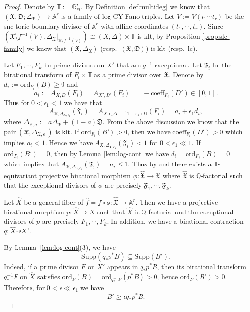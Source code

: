\documentclass[reqno, 12pt]{amsart}
\theoremstyle{definition}
\newcommand{\bA}{\mathbb{A}}
\newcommand{\bQ}{\mathbb{Q}}
\newcommand{\bG}{\mathbb{G}}
\newcommand{\bT}{\mathbb{T}}
\newcommand{\hX}{\widehat{X}}
\newcommand{\Supp}{\mathrm{Supp}}
\newcommand{\ord}{\mathrm{ord}}
\newcommand{\fX}{\mathfrak{X}}
\newcommand{\fD}{\mathfrak{D}}
\newcommand{\fF}{\mathfrak{F}}
\newcommand{\hf}{\hat{f}}
\newcommand{\hfX}{\widehat{\mathfrak{X}}}
\newcommand{\coeff}{\mathrm{coeff}}
\newcommand{\Exc}{\mathrm{Exc}}
\numberwithin{equation}{section}
\begin{document}
\begin{proof}
Denote by $\bT:=\bG_m^r$. By Definition \ref{def:multideg} we know that $(\fX, \fD;\Delta_{\fX}) \to \bA^r$  is a family of log CY-Fano triples. Let $V:=V(t_1\cdots t_r)$ be the snc toric boundary divisor of $\bA^r$ with affine coordinates $(t_1,\cdots, t_r)$.
Since $(\fX\setminus f^{-1}(V), \Delta_{\fX}|_{\fX \setminus f^{-1}(V)})\cong (X,\Delta)\times \bT$ is klt, by Proposition \ref{prop:slc-family} we know that $(\fX, \Delta_{\fX})$ (resp.\ $(\fX, \fD)$) is klt (resp.\ lc). 


Let $F_1,\cdots, F_k$ be prime divisors on $X'$ that are $g^{-1}$-exceptional. Let $\fF_i$ be the birational transform of $F_i \times \bT$ as a prime divisor over $\fX$. Denote by $d_i:=\ord_{F_i}(B)\geq 0$ and 
\[
a_i:=A_{X,D}(F_i) = A_{X',D'}(F_i) = 1-\coeff_{F_i}(D')\in [0, 1].
\]
Thus for $0<\epsilon_1< 1$ we have that 
\[
A_{\fX,\Delta_{\fX,\epsilon_1}}(\fF_i)= A_{X, \epsilon_1\Delta + (1-\epsilon_1)D} (F_i) = a_i+\epsilon_1 d_i,
\]
where $\Delta_{\fX,a}:=a \Delta_{\fX} + (1-a)\fD$.
From the above discussion we know that the pair $(\fX, \Delta_{\fX,\epsilon_1})$ is klt. 
If $\ord_{F_i}(B') >0$, then we have $\coeff_{F_i}(D')>0$ which implies $a_i <1$. Hence we have $A_{\fX,\Delta_{\fX,\epsilon_1}}(\fF_i)<1$ for $0<\epsilon_1\ll 1$. If $\ord_{F_i}(B')=0$, then by Lemma \ref{lem:log-cont} we have $d_i = \ord_{F_i}(B) = 0$ which implies that $A_{\fX,\Delta_{\fX,\epsilon_1}}(\fF_i) = a_i \leq 1$. 
Thus by \cite{BCHM10} and \cite[Corollary 1.38]{Kol13} there exists a $\bT$-equivariant projective birational morphism $\phi: \hfX\to \fX$ where $\hfX$ is $\bQ$-factorial such that the exceptional divisors of $\phi$ are precisely $\fF_1,\cdots, \fF_k$. 


Let $\hX$ be a general fiber of $\hf= f\circ \phi:\hfX\to \bA^r$. Then we have a projective birational morphism $p: \hX \to X$ such that $\hX$ is $\bQ$-factorial and the exceptional divisors of $p$ are precisely $F_1, \cdots, F_k$.
In addition, we have a birational contraction $q: \hX \dashrightarrow X'$. 

By Lemma~\ref{lem:log-cont}(3), we have
\[
\Supp(q_*p^*B)\subseteq \Supp(B').
\]
Indeed, if a prime divisor $F$ on $X'$ appears in $q_*p^*B$, then its
birational transform $q_*^{-1}F$ on $\hX$ satisfies
$\ord_F(B) = \ord_{q_*^{-1}F}(p^*B)>0$, hence $\ord_F(B')>0$. 
Therefore, for $0<\epsilon \ll \epsilon_1$ we have
\begin{equation}\label{eq:fg-epsilon}
    B'\geq \epsilon q_* p^* B. 
\end{equation}




\end{proof}
\end{document}
